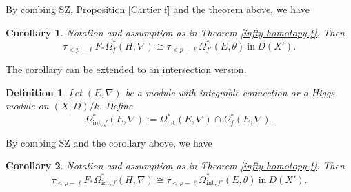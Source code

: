 \documentclass[12pt, a4paper]{article}
\newtheorem{definition}{Definition}[section]
\newtheorem{corollary}{Corollary}[section]
\begin{document}
By combing SZ, Proposition \ref{Cartier f} and the theorem above, we have
\begin{corollary}
Notation and assumption as in Theorem \ref{infty homotopy f}. Then
$$
\tau_{<p-\ell}F_*\Omega_f^*(H,\nabla)\cong\tau_{<p-\ell}\Omega_{f'}^*(E,\theta)~\mathrm{in}~D(X').
$$
\end{corollary}
The corollary can be extended to an intersection version.
\begin{definition}
 Let $(E,\nabla)$ be a module with integrable connection or a Higgs module on $(X,D)/k$. Define $$\Omega^*_{\mathrm{int},f}(E,\nabla)
:=\Omega^*_\mathrm{int}(E,\nabla)\cap\Omega^*_f(E,\nabla).
$$
\end{definition}
By combing SZ and the corollary above, we have
\begin{corollary}\label{nearby de Rham-Higgs}
Notation and assumption as in Theorem \ref{infty homotopy f}. Then
$$
\tau_{<p-\ell} F_*\Omega^*_{\mathrm{int},f}(H,\nabla)\cong\tau_{<p-\ell}\Omega^*_{\mathrm{int},f'}(E,\theta)~\mathrm{in}~D(X').
$$
\end{corollary}
\end{document}
